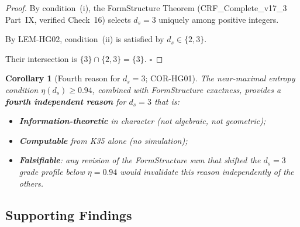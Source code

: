 \documentclass[12pt, a4paper]{article}
\newtheorem{corollary}{Corollary}[section]
\begin{document}
\begin{proof}
By condition~(i), the FormStructure Theorem (CRF\_Complete\_v17\_3
Part~IX, verified Check~16) selects $d_s = 3$ uniquely among
positive integers.

By LEM-HG02, condition~(ii) is satisfied by $d_s \in \{2, 3\}$.

Their intersection is $\{3\} \cap \{2, 3\} = \{3\}$.
\hfill$\square$
\end{proof}

\begin{corollary}[Fourth reason for $d_s = 3$; COR-HG01]
\label{cor:fourth}
The near-maximal entropy condition $\eta(d_s) \geq 0.94$, combined
with FormStructure exactness, provides a \textbf{fourth independent
reason} for $d_s = 3$ that is:
\begin{itemize}[leftmargin=*]
  \item \textbf{Information-theoretic} in character (not algebraic,
    not geometric);
  \item \textbf{Computable} from K35 alone (no simulation);
  \item \textbf{Falsifiable}: any revision of the FormStructure
    sum that shifted the $d_s = 3$ grade profile below $\eta = 0.94$
    would invalidate this reason independently of the others.
\end{itemize}
\end{corollary}

\subsection{Supporting Findings}
\label{sec:findings}
\end{document}
